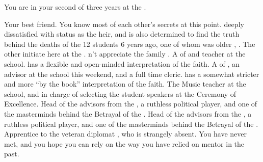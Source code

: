 \documentclass[char]{GL2020}
\begin{document}
\begin{itemz}[Notes]
	\item You are in your second of three years at the \pSchool{}.
\end{itemz}

\begin{contacts}
	\contact{\cHeir{}} Your best friend. You know most of each other's secrets at this point.  \cHeir{\Theyare} deeply dissatisfied with  \cHeir{\their} status as the \cHeir{\formal} heir, and is also determined to find the truth behind the deaths of the 12 students 6 years ago, one of whom was \cHeir{\their} older \cHeirSibling{\sibling}, \cHeirSibling{\full}.
	\contact{\cInitiate{}} The other \pShippie{} initiate here at the \pSc{}. \cInitiate{\They} \cInitiate{\does}n't appreciate the family \cInitiate{\they} \cInitiate{\have}.
\contact{\cFlowPriest{}} A \cFlowPriest{\cleric} of \cFlow{} and teacher at the school. \cFlowPriest{\They} has a flexible and open-minded interpretation of the faith.
	\contact{\cEbbPriest{}} A \cEbbPriest{\cleric} of \cEbb{}, an advisor at the school this weekend, and a full time cleric. \cEbbPriest{} has a somewhat stricter and more ``by the book'' interpretation of the faith.
	\contact{\cMusic{}} The Music teacher at the school, and in charge of selecting the student speakers at the Ceremony of Excellence.
	\contact{\cDiplomat{}} Head of the advisors from the \pTech{}, a ruthless political player, and one of the masterminds behind the Betrayal of the \pShip{}. 
	\contact{\cEvil{}} Head of the advisors from the \pFarm{}, a ruthless political player, and one of the masterminds behind the Betrayal of the \pShip{}. 
\contact{\cJuniorStatesman{}} Apprentice to the veteran \pShip{} diplomat \cHeadDiplomat{}, who is strangely absent. You have never met, and you hope you can rely on \cJuniorStatesman{} the way you have relied on \cJuniorStatesman{\their} mentor in the past.
\end{contacts}
\end{document}
